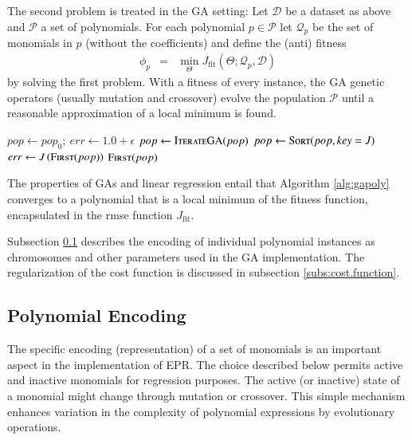 \documentclass[times,review,preprint]{elsarticle}
\begin{document}
The second problem is treated in the \ac{GA} setting: Let $\mathcal{D}$ be a dataset as above and $\mathcal{P}$ a set of polynomials. For each polynomial $p\in \mathcal{P}$ let $\mathcal{Q}_p$ be the set of monomials in $p$ (without the coefficients) and define the (anti) fitness
%
\begin{eqnarray*}
\phi_p &=& \min_\Theta J_{\textrm{fit}}\left(\Theta;\mathcal{Q}_p,\mathcal{D}\right)
\end{eqnarray*}
%
by solving the first problem. With a fitness of every instance, the \ac{GA} genetic operators (usually mutation and crossover) evolve the population $\mathcal{P}$ until a reasonable approximation of a local minimum is found. 
%
\begin{algorithm}[t]
\begin{algorithmic}
	\State $pop \gets pop_0;\: err \gets 1.0+\epsilon$
		\State $pop \gets \Call{IterateGA}{pop}$
		\State $pop \gets \Call{Sort}{pop, key = J}$
		\State $err \gets J\left(\Call{First}{pop}\right)$
	\EndWhile
	\State\Return $\Call{First}{pop}$
\EndFunction
\end{algorithmic}
\caption{This \ac{EPR} algorithm uses linear regression for the calculation of the \ac{rmse} $J$ and the space of polynomials is searched in the \acp{GA} iteration step. At exit the \ac{rmse} of the fittest instance is bounded by $\epsilon$ or the maximum number of allowed iterations.}\label{alg:gapoly}
\end{algorithm} 
%
The properties of \acp{GA} and linear regression entail that Algorithm \ref{alg:gapoly} converges to a polynomial that is a local minimum of the fitness function, encapsulated in the \ac{rmse} function $J_{\textrm{fit}}$.
%

%
Subsection \ref{subs:polynomial.encoding} describes the encoding of individual polynomial instances as chromosomes and other parameters used in the \ac{GA} implementation. The regularization of the cost function is discussed in subsection \ref{subs:cost.function}.

%
\subsection{Polynomial Encoding}\label{subs:polynomial.encoding}

The specific encoding (representation) of a set of monomials is an important aspect in the implementation of \ac{EPR}. The choice described below permits active and inactive monomials for regression purposes. The active (or inactive) state of a monomial might change through mutation or crossover. This simple mechanism enhances variation in the complexity of polynomial expressions by evolutionary operations.
\end{document}
